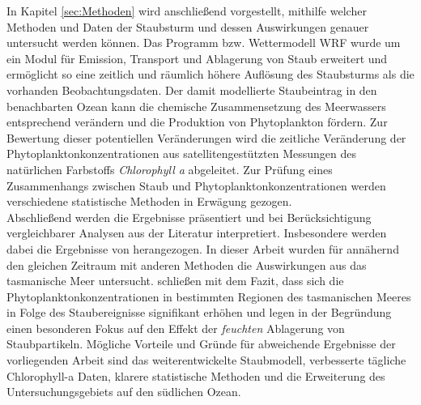 \documentclass[12pt,a4paper,onecolumn]{scrartcl}
\begin{document}
In Kapitel \ref{sec:Methoden} wird anschließend vorgestellt, mithilfe welcher Methoden und Daten der Staubsturm und dessen Auswirkungen genauer untersucht werden können. Das Programm bzw. Wettermodell WRF wurde um ein Modul für Emission, Transport und Ablagerung von Staub erweitert und ermöglicht so eine zeitlich und räumlich höhere Auflösung des Staubsturms als die vorhanden Beobachtungsdaten. Der damit modellierte Staubeintrag in den benachbarten Ozean kann die chemische Zusammensetzung des Meerwassers entsprechend verändern und die Produktion von Phytoplankton fördern. Zur Bewertung dieser potentiellen Veränderungen wird die zeitliche Veränderung der Phytoplanktonkonzentrationen aus satellitengestützten Messungen des natürlichen Farbstoffs \textit{Chlorophyll a} abgeleitet. Zur Prüfung eines Zusammenhangs zwischen Staub und Phytoplanktonkonzentrationen werden verschiedene statistische Methoden in Erwägung gezogen.\\

Abschließend werden die Ergebnisse präsentiert und bei Berücksichtigung vergleichbarer Analysen aus der Literatur interpretiert. Insbesondere werden dabei die Ergebnisse von \citet{Gabric.2016} herangezogen. In dieser Arbeit wurden  für annähernd den gleichen Zeitraum mit anderen Methoden die Auswirkungen aus das tasmanische Meer untersucht.  \citet{Gabric.2016} schließen mit dem Fazit, dass sich die Phytoplanktonkonzentrationen in bestimmten Regionen des tasmanischen Meeres in Folge des Staubereignisse signifikant erhöhen und legen in der Begründung einen besonderen Fokus auf den Effekt der  \textit{feuchten} Ablagerung von Staubpartikeln. Mögliche Vorteile und Gründe für abweichende Ergebnisse der vorliegenden Arbeit sind das weiterentwickelte Staubmodell, verbesserte tägliche Chlorophyll-a Daten, klarere statistische Methoden und die Erweiterung des Untersuchungsgebiets auf den südlichen Ozean.
\end{document}
